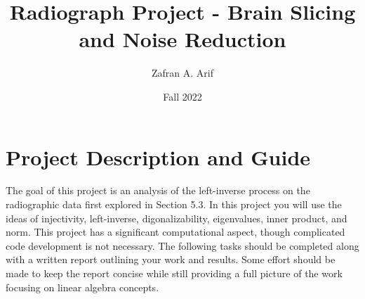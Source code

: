 \documentclass{article}
\title{Radiograph Project - Brain Slicing and Noise Reduction}
\author{Zafran A. Arif}
\date{Fall 2022}
\begin{document}
\maketitle
\tableofcontents
\pagebreak

\section{Project Description and Guide}
The goal of this project is an analysis of the left-inverse process on the radiographic data first explored in Section 5.3. In this project you will use the ideas of injectivity, left-inverse, digonalizability, eigenvalues, inner product, and norm. This project has a significant computational aspect, though complicated code development is not necessary. The following tasks should be completed along with a written report outlining your work and results. Some effort should be made to keep the report concise while still providing a full picture of the work focusing on linear algebra concepts.
\end{document}
